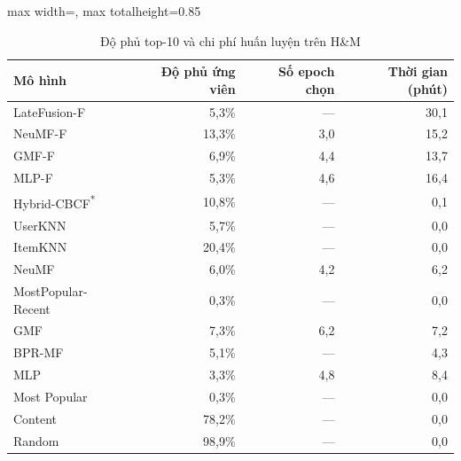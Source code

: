 \begin{table}[H]
    \centering\small
    \caption{Độ phủ top-10 và chi phí huấn luyện trên H\&M}
    \label{tab:v2beyond}
    \begin{adjustbox}{max width=\textwidth, max totalheight=0.85\textheight}
    \begin{tabular}{|l|r|r|r|}
        \hline
        Mô hình & Độ phủ ứng viên & Số epoch chọn & Thời gian (phút) \\ \hline
        LateFusion-F & 5{,}3\% & --- & 30{,}1 \\ \hline
        NeuMF-F & 13{,}3\% & 3{,}0 & 15{,}2 \\ \hline
        GMF-F & 6{,}9\% & 4{,}4 & 13{,}7 \\ \hline
        MLP-F & 5{,}3\% & 4{,}6 & 16{,}4 \\ \hline
        Hybrid-CBCF\textsuperscript{*} & 10{,}8\% & --- & 0{,}1 \\ \hline
        UserKNN & 5{,}7\% & --- & 0{,}0 \\ \hline
        ItemKNN & 20{,}4\% & --- & 0{,}0 \\ \hline
        NeuMF & 6{,}0\% & 4{,}2 & 6{,}2 \\ \hline
        MostPopular-Recent & 0{,}3\% & --- & 0{,}0 \\ \hline
        GMF & 7{,}3\% & 6{,}2 & 7{,}2 \\ \hline
        BPR-MF & 5{,}1\% & --- & 4{,}3 \\ \hline
        MLP & 3{,}3\% & 4{,}8 & 8{,}4 \\ \hline
        Most Popular & 0{,}3\% & --- & 0{,}0 \\ \hline
        Content & 78{,}2\% & --- & 0{,}0 \\ \hline
        Random & 98{,}9\% & --- & 0{,}0 \\ \hline
    \end{tabular}
    \end{adjustbox}
\end{table}
